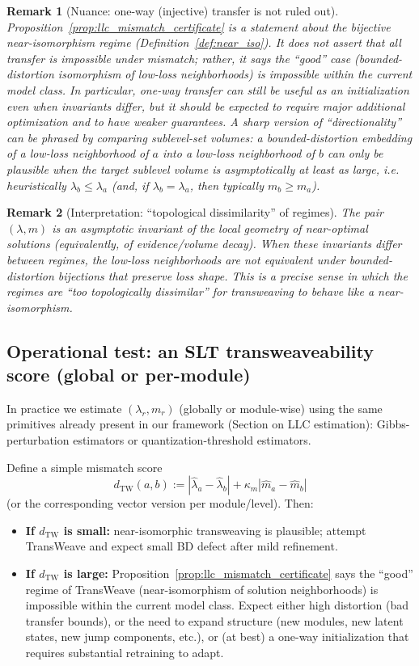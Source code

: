 \documentclass[11pt]{article}
\newtheorem{remark}{Remark}
\begin{document}
\begin{remark}[Nuance: one-way (injective) transfer is not ruled out]
Proposition~\ref{prop:llc_mismatch_certificate} is a statement about the \emph{bijective} near-isomorphism regime
(Definition~\ref{def:near_iso}). It does not assert that all transfer is impossible under mismatch; rather, it says the
``good'' case (bounded-distortion isomorphism of low-loss neighborhoods) is impossible within the current model class.
In particular, one-way transfer can still be useful as an \emph{initialization} even when invariants differ, but it should be
expected to require major additional optimization and to have weaker guarantees.
A sharp version of ``directionality'' can be phrased by comparing sublevel-set volumes:
a bounded-distortion embedding of a low-loss neighborhood of $a$ into a low-loss neighborhood of $b$
can only be plausible when the target sublevel volume is asymptotically at least as large, i.e. heuristically
$\lambda_b \le \lambda_a$ (and, if $\lambda_b=\lambda_a$, then typically $m_b \ge m_a$).
\end{remark}

\begin{remark}[Interpretation: ``topological dissimilarity'' of regimes]
The pair $(\lambda,m)$ is an asymptotic invariant of the local geometry of near-optimal solutions
(equivalently, of evidence/volume decay). When these invariants differ between regimes, the
low-loss neighborhoods are not equivalent under bounded-distortion bijections that preserve loss shape.
This is a precise sense in which the regimes are ``too topologically dissimilar'' for transweaving to
behave like a near-isomorphism.
\end{remark}

\subsection{Operational test: an SLT transweaveability score (global or per-module)}
In practice we estimate $(\lambda_r,m_r)$ (globally or module-wise) using the same primitives already
present in our framework (Section on LLC estimation): Gibbs-perturbation estimators or
quantization-threshold estimators.

Define a simple mismatch score
\[
d_{\mathrm{TW}}(a,b) := |\hat\lambda_a-\hat\lambda_b| + \kappa_m |\hat m_a-\hat m_b|
\]
(or the corresponding vector version per module/level). Then:
\begin{itemize}
\item \textbf{If $d_{\mathrm{TW}}$ is small:} near-isomorphic transweaving is plausible; attempt TransWeave
and expect small BD defect after mild refinement.
\item \textbf{If $d_{\mathrm{TW}}$ is large:} Proposition~\ref{prop:llc_mismatch_certificate} says the
``good'' regime of TransWeave (near-isomorphism of solution neighborhoods) is impossible within
the current model class. Expect either high distortion (bad transfer bounds), or the need to expand
structure (new modules, new latent states, new jump components, etc.), or (at best) a one-way initialization that
requires substantial retraining to adapt.
\end{itemize}
\end{document}
